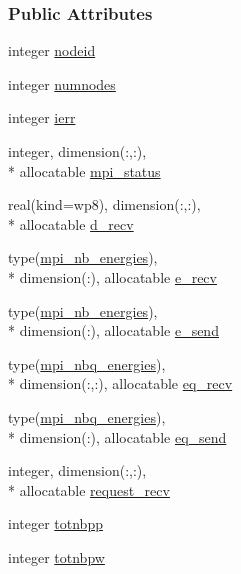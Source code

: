 \subsubsection*{Public Attributes}
\begin{DoxyCompactItemize}
\item 
integer \hyperlink{classmpiglob_aafd77c973e66035b1e44b11b715dd7d2}{nodeid}
\item 
integer \hyperlink{classmpiglob_a464a7de45a158a58a5fa1a42f409bc22}{numnodes}
\item 
integer \hyperlink{classmpiglob_a2812a8f03176fc85c7f84fc69d9e85a4}{ierr}
\item 
integer, dimension(\-:,\-:), \\*
allocatable \hyperlink{classmpiglob_ae890fb0efe3f1ae2f40c1b905fea0f5d}{mpi\-\_\-status}
\item 
real(kind=wp8), dimension(\-:,\-:), \\*
allocatable \hyperlink{classmpiglob_a28a42af93cf4dd93dbb5c2c3a17c0be5}{d\-\_\-recv}
\item 
type(\hyperlink{structmpiglob_1_1mpi__nb__energies}{mpi\-\_\-nb\-\_\-energies}), \\*
dimension(\-:), allocatable \hyperlink{classmpiglob_a727c36858f53d3936ac09c5c47f156de}{e\-\_\-recv}
\item 
type(\hyperlink{structmpiglob_1_1mpi__nb__energies}{mpi\-\_\-nb\-\_\-energies}), \\*
dimension(\-:), allocatable \hyperlink{classmpiglob_a62f85c20d3ad9a3d045f88383b4ba347}{e\-\_\-send}
\item 
type(\hyperlink{structmpiglob_1_1mpi__nbq__energies}{mpi\-\_\-nbq\-\_\-energies}), \\*
dimension(\-:,\-:), allocatable \hyperlink{classmpiglob_a46847840769857fcdc31f2c00a37d2f7}{eq\-\_\-recv}
\item 
type(\hyperlink{structmpiglob_1_1mpi__nbq__energies}{mpi\-\_\-nbq\-\_\-energies}), \\*
dimension(\-:), allocatable \hyperlink{classmpiglob_aa5162187aa3deaa137edd37c57e87ab6}{eq\-\_\-send}
\item 
integer, dimension(\-:,\-:), \\*
allocatable \hyperlink{classmpiglob_ad79036e2e9749dc0366d88be2733bd4d}{request\-\_\-recv}
\item 
integer \hyperlink{classmpiglob_acb24c7c7e56cdaa3d4d13bf504a45301}{totnbpp}
\item 
integer \hyperlink{classmpiglob_a7c62e6bb98eaa920eab355149e07538b}{totnbpw}

\end{DoxyCompactItemize}
